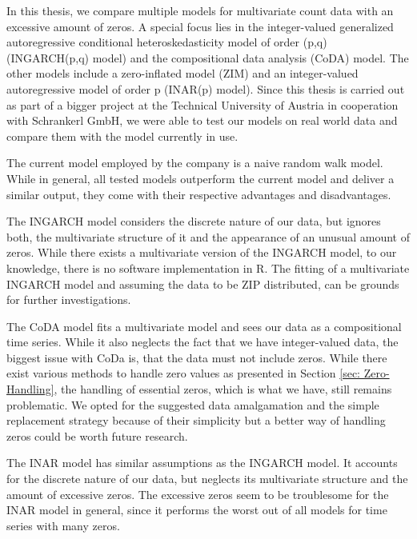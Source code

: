 In this thesis, we compare multiple models for multivariate count data with an excessive amount of zeros. A special focus lies in the integer-valued generalized autoregressive conditional heteroskedasticity model of order (p,q) (INGARCH(p,q) model) and the compositional data analysis (CoDA) model. The other models include a zero-inflated model (ZIM) and an integer-valued autoregressive model of order p (INAR(p) model). Since this thesis is carried out as part of a bigger project at the Technical University of Austria in cooperation with Schrankerl GmbH, we were able to test our models on real world data and compare them with the model currently in use. 

The current model employed by the company is a naive random walk model. While in general, all tested models outperform the current model and deliver a similar output, they come with their respective advantages and disadvantages.

The INGARCH model considers the discrete nature of our data, but ignores both, the multivariate structure of it and the appearance of an unusual amount of zeros. While there exists a multivariate version of the INGARCH model, to our knowledge, there is no software implementation in R. The fitting of a multivariate INGARCH model and assuming the data to be ZIP distributed, can be grounds for further investigations. %

The CoDA model fits a multivariate model and sees our data as a compositional time series. While it also neglects the fact that we have integer-valued data, the biggest issue with CoDa is, that the data must not include zeros. While there exist various methods to handle zero values as presented in Section \ref{sec: Zero-Handling}, the handling of essential zeros, which is what we have, still remains problematic. We opted for the suggested data amalgamation and the simple replacement strategy because of their simplicity but a better way of handling zeros could be worth future research. 

The INAR model has similar assumptions as the INGARCH model. It accounts for the discrete nature of our data, but neglects its multivariate structure and the amount of excessive zeros. The excessive zeros seem to be troublesome for the INAR model in general, since it performs the worst out of all models for time series with many zeros. 

